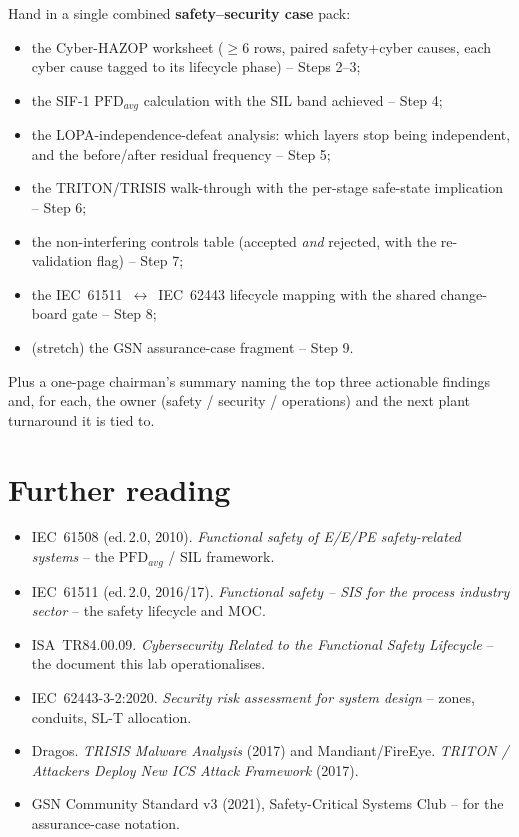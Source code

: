 \documentclass[11pt,a4paper]{article}
\begin{document}
\begin{deliverbox}
Hand in a single combined \textbf{safety--security case} pack:
\begin{itemize}[leftmargin=1.4em]\setlength{\itemsep}{1pt}
  \item the Cyber-HAZOP worksheet ($\geq 6$ rows, paired safety+cyber causes,
        each cyber cause tagged to its lifecycle phase) -- Steps 2--3;
  \item the SIF-1 $\mathrm{PFD}_{avg}$ calculation with the SIL band achieved
        -- Step 4;
  \item the LOPA-independence-defeat analysis: which layers stop being
        independent, and the before/after residual frequency -- Step 5;
  \item the TRITON/TRISIS walk-through with the per-stage safe-state
        implication -- Step 6;
  \item the non-interfering controls table (accepted \emph{and} rejected, with
        the re-validation flag) -- Step 7;
  \item the IEC~61511~$\leftrightarrow$~IEC~62443 lifecycle mapping with the
        shared change-board gate -- Step 8;
  \item (stretch) the GSN assurance-case fragment -- Step 9.
\end{itemize}
Plus a one-page chairman's summary naming the top three actionable findings
and, for each, the owner (safety / security / operations) and the next plant
turnaround it is tied to.
\end{deliverbox}

\section*{Further reading}

\begin{notebox}
\begin{itemize}[leftmargin=1.4em]\setlength{\itemsep}{1pt}
  \item IEC~61508 (ed.\,2.0, 2010). \emph{Functional safety of E/E/PE
        safety-related systems} -- the $\mathrm{PFD}_{avg}$ / SIL framework.
  \item IEC~61511 (ed.\,2.0, 2016/17). \emph{Functional safety -- SIS for the
        process industry sector} -- the safety lifecycle and MOC.
  \item ISA~TR84.00.09. \emph{Cybersecurity Related to the Functional Safety
        Lifecycle} -- the document this lab operationalises.
  \item IEC~62443-3-2:2020. \emph{Security risk assessment for system design}
        -- zones, conduits, SL-T allocation.
  \item Dragos. \emph{TRISIS Malware Analysis} (2017) and Mandiant/FireEye.
        \emph{TRITON / Attackers Deploy New ICS Attack Framework} (2017).
  \item GSN Community Standard v3 (2021), Safety-Critical Systems Club --
        for the assurance-case notation.
\end{itemize}
\end{notebox}
\end{document}
